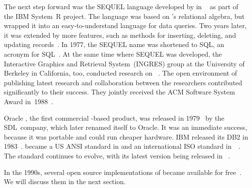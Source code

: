 The next step forward was the SEQUEL language developed by \citeauthor{CB1974SASEQL} in \citeyear{CB1974SASEQL}~\cite{CB1974SASEQL} as part of the IBM System~R project.
The language was based on \citeauthor{C1970ARMODFLSDB}'s relational algebra, but wrapped it into an easy-to-understand language for data queries.
Two years later, it was extended by more features, such as methods for inserting, deleting, and updating records~\cite{CAEGLMRB1976S2AUATDDMAC}.
In 1977, the SEQUEL name was shortened to \acrshort{SQL}, an acronym for \acrfull{SQL}~\cite{C20245YOQ}.
At the same time where SEQUEL was developed, the Interactive Graphics and Retrieval System~(INGRES) group at the University of Berkeley in California, too, conducted research on ~\cite{S1986TIPAOARDS}.
The open environment of publishing latest research and collaboration between the researchers contributed significantly to their success.
They jointly received the ACM Software System Award in~1988~\cite{C20245YOQ}.

Oracle , the first commercial -based product, was released in 1979~\cite{C20245YOQ} by the SDL~company, which later renamed itself to Oracle.
It was an immediate success, because it was portable and could run cheaper hardware.
IBM released its   DB2 in 1983~\cite{C20245YOQ,HS2013THAGOID}.
 became a US ANSI standard in \citeyear{ANSIX3135} and an international ISO standard in~\citeyear{ISO90751987}~\cite{ANSIX3135,ISO90751987}.
The standard continues to evolve, with its latest version being released in \citeyear{ISOIEC9707112023E}~\cite{ISOIEC9707112023E}.

In the 1990s, several open source implementations of  became available for free~\cite{C20245YOQ}.
We will discuss them in the next section.%
%
\endhsection%
%
